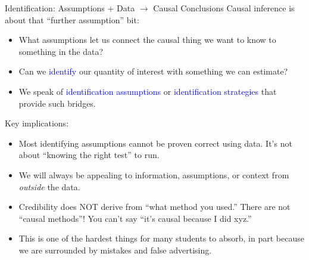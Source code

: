 \documentclass[handout,xcolor=dvipsnames,pdftex,hyperref={colorlinks=false}]{beamer}
\begin{document}
\begin{frame}{Identification: Assumptions + Data $\rightarrow$ Causal Conclusions}
\footnotesize
{} Causal inference is about that ``further assumption'' bit:
\begin{itemize}
\item<2-> What assumptions let us connect the causal thing we want to know to something in the data?
\item<3-> Can we \textcolor{blue}{identify} our quantity of interest with something we can estimate?
\item<4-> We speak of \textcolor{blue}{identification assumptions} or \textcolor{blue}{identification strategies} that provide such bridges.
\end{itemize}
\medskip
{} Key implications:
\begin{itemize}
\item<6-> Most identifying assumptions cannot be proven correct using data. It's not about ``knowing the right test'' to run.
\item<7-> We will always be appealing to information, assumptions, or context from \textit{outside} the data.
\item<8-> Credibility does NOT derive from ``what method you used.'' There are not ``causal methods''! You can't say ``it's causal because I did xyz.''
\item<9-> This is one of the hardest things for many students to absorb, in part because we are surrounded by mistakes and false advertising.
\end{itemize}
\end{frame}
\end{document}
